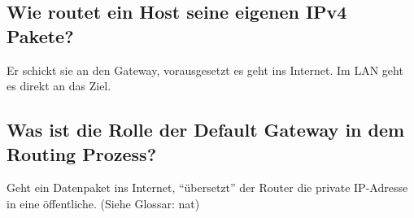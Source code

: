 \subsection*{Wie routet ein Host seine eigenen IPv4 Pakete?}
Er schickt sie an den Gateway, vorausgesetzt es geht ins Internet. Im LAN geht es direkt an das Ziel.

\subsection*{Was ist die Rolle der Default Gateway in dem Routing Prozess?}
Geht ein Datenpaket ins Internet, "`übersetzt"' der Router die private IP-Adresse in eine öffentliche. (Siehe Glossar: \gls{nat})
